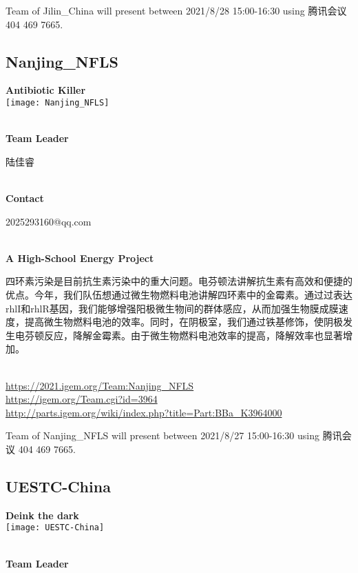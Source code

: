 Team of Jilin\_China will present between       2021/8/28 15:00-16:30  using 腾讯会议 404 469 7665.
\newpage


\subsection{\textcolor{Blu}{ Nanjing\_NFLS } }
\vspace{5mm}
\begin{center}
\large{
  \textbf{ Antibiotic Killer }\\
  \texttt{[image: Nanjing\_NFLS]}
}
\end{center}
\textbf{\\Team Leader}

  陆佳睿


\textbf{\\Contact}

  2025293160@qq.com


\textbf{\\A High-School Energy Project\\}\begin{spacing}{1.5}

四环素污染是目前抗生素污染中的重大问题。电芬顿法讲解抗生素有高效和便捷的优点。今年，我们队伍想通过微生物燃料电池讲解四环素中的金霉素。通过过表达rhlI和rhlR基因，我们能够增强阳极微生物间的群体感应，从而加强生物膜成膜速度，提高微生物燃料电池的效率。同时，在阴极室，我们通过铁基修饰，使阴极发生电芬顿反应，降解金霉素。由于微生物燃料电池效率的提高，降解效率也显著增加。\end{spacing}
\\

\url{https://2021.igem.org/Team:Nanjing\_NFLS }\\
\url{https://igem.org/Team.cgi?id=3964 }\\
\url{http://parts.igem.org/wiki/index.php?title=Part:BBa_K3964000 }\\


\vfill{}









Team of Nanjing\_NFLS will present between  2021/8/27 15:00-16:30       using 腾讯会议 404 469 7665.
\newpage


\subsection{\textcolor{Blu}{ UESTC-China } }
\vspace{5mm}
\begin{center}
\large{
  \textbf{ Deink the dark }\\
  \texttt{[image: UESTC-China]}
}
\end{center}
\textbf{\\Team Leader}

